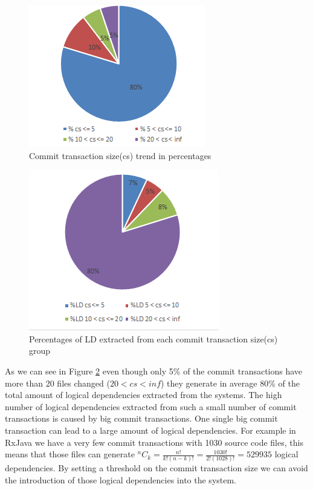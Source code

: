 \documentclass[12pt]{mitthesis}
\newcommand*{\Comb}[2]{{}^{#1}C_{#2}}%
\begin{document}
\begin{figure}[h]
\centering
\includegraphics{fig_cs.png}
\caption{Commit transaction size(cs) trend in percentages}
\label{fig:fig_cs}
\centering
\end{figure}


\begin{figure}[h]
\centering
\includegraphics[scale=0.9]{fig_ld_ts.png}
\caption{Percentages of LD extracted from each commit transaction size(cs) group}
\label{fig:fig_ld_ts}
\centering
\end{figure}

As we can see in Figure \ref{fig:fig_ld_ts} even though only 5\% of the commit transactions have more than 20 files changed ($20<cs<inf$) they generate in average 80\% of the total amount of logical dependencies extracted from the systems.
The high number of logical dependencies extracted from such a small number of commit transactions is caused by big commit transactions. 
One single big commit transaction can lead to a large amount of logical dependencies. For example in RxJava we have a very few commit transactions with 1030 source code files, this means that those files can generate 
$\Comb{n}{k}=\frac{n!}{k!(n-k)!} = \frac{1030!}{2!(1028)!} = 529 935$ logical dependencies. By setting a threshold on the commit transaction size we can avoid the introduction of those logical dependencies into the system.
\end{document}
